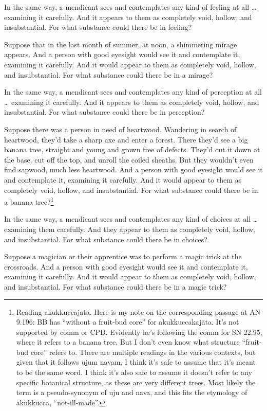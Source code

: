 \documentclass[12pt,openany]{book}%
\begin{document}
In the same way, a mendicant sees and contemplates any kind of feeling at all … examining it carefully. And it appears to them as completely void, hollow, and insubstantial. For what substance could there be in feeling? 

Suppose that in the last month of summer, at noon, a shimmering mirage appears. And a person with good eyesight would see it and contemplate it, examining it carefully. And it would appear to them as completely void, hollow, and insubstantial. For what substance could there be in a mirage? 

In the same way, a mendicant sees and contemplates any kind of perception at all … examining it carefully. And it appears to them as completely void, hollow, and insubstantial. For what substance could there be in perception? 

Suppose there was a person in need of heartwood. Wandering in search of heartwood, they’d take a sharp axe and enter a forest. There they’d see a big banana tree, straight and young and grown free of defects. They’d cut it down at the base, cut off the top, and unroll the coiled sheaths. But they wouldn’t even find sapwood, much less heartwood. And a person with good eyesight would see it and contemplate it, examining it carefully. And it would appear to them as completely void, hollow, and insubstantial. For what substance could there be in a banana tree?\footnote{Reading akukkuccajata. Here is my note on the corresponding passage at AN 9.196: BB has “without a fruit-bud core” for \textsanskrit{akukkuccakajāta}. It’s not supported by comm or CPD. Evidently he’s following the comm for SN 22.95, where it refers to a banana tree. But I don’t even know what structure “fruit-bud core” refers to. There are multiple readings in the various contexts, but given that it follows ujum navam, I think it’s safe to assume that it’s meant to be the same word. I think it’s also safe to assume it doesn’t refer to any specific botanical structure, as these are very different trees. Most likely the term is a pseudo-synonym of uju and nava, and this fits the etymology of akukkucca, “not-ill-made”. } 

In the same way, a mendicant sees and contemplates any kind of choices at all … examining them carefully. And they appear to them as completely void, hollow, and insubstantial. For what substance could there be in choices? 

Suppose a magician or their apprentice was to perform a magic trick at the crossroads. And a person with good eyesight would see it and contemplate it, examining it carefully. And it would appear to them as completely void, hollow, and insubstantial. For what substance could there be in a magic trick? 
\end{document}
